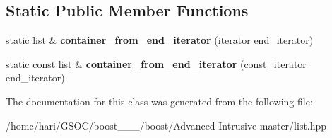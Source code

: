 \subsection*{Static Public Member Functions}
\begin{DoxyCompactItemize}
\item 
\mbox{\label{classboost_1_1intrusive_1_1list_a2ae036a74c66652d8552e1d76abdad31}} 
static \hyperlink{classboost_1_1intrusive_1_1list}{list} \& {\bfseries container\+\_\+from\+\_\+end\+\_\+iterator} (iterator end\+\_\+iterator)
\item 
\mbox{\label{classboost_1_1intrusive_1_1list_a411026709c541314c1cf8abf500722ab}} 
static const \hyperlink{classboost_1_1intrusive_1_1list}{list} \& {\bfseries container\+\_\+from\+\_\+end\+\_\+iterator} (const\+\_\+iterator end\+\_\+iterator)
\end{DoxyCompactItemize}


The documentation for this class was generated from the following file\+:\begin{DoxyCompactItemize}
\item 
/home/hari/\+G\+S\+O\+C/boost\+\_\+\_\+\_/boost/\+Advanced-\/\+Intrusive-\/master/list.\+hpp\end{DoxyCompactItemize}
